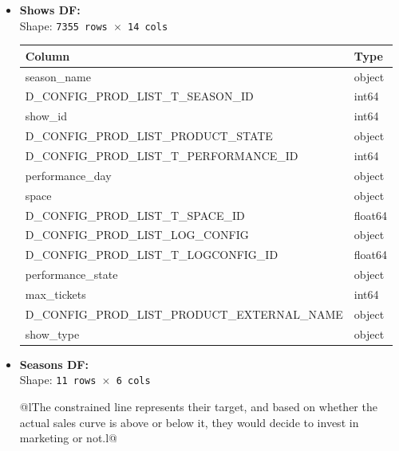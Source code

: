 \documentclass{Configuration_Files/PoliMi3i_thesis}
\begin{document}
\begin{itemize}
  \item \textbf{Shows DF:}\\[-0.5ex]
        Shape: \texttt{7355 rows $\times$ 14 cols}\\[1ex]
        \begin{tabular}{@{}ll@{}}
          \toprule
          \textbf{Column}                             & \textbf{Type}     \\
          \midrule
          season\_name                                & object            \\
          D\_CONFIG\_PROD\_LIST\_T\_SEASON\_ID        & int64             \\
          show\_id                                   & int64             \\
          D\_CONFIG\_PROD\_LIST\_PRODUCT\_STATE       & object            \\
          D\_CONFIG\_PROD\_LIST\_T\_PERFORMANCE\_ID   & int64             \\
          performance\_day                           & object            \\
          space                                       & object            \\
          D\_CONFIG\_PROD\_LIST\_T\_SPACE\_ID         & float64           \\
          D\_CONFIG\_PROD\_LIST\_LOG\_CONFIG          & object            \\
          D\_CONFIG\_PROD\_LIST\_T\_LOGCONFIG\_ID     & float64           \\
          performance\_state                         & object            \\
          max\_tickets                               & int64             \\
          D\_CONFIG\_PROD\_LIST\_PRODUCT\_EXTERNAL\_NAME & object          \\
          show\_type                                  & object            \\
          \bottomrule
        \end{tabular}
\clearpage
  \item \textbf{Seasons DF:}\\[-0.5ex]
        Shape: \texttt{11 rows $\times$ 6 cols}\\[1ex]
        \begin{tabular}{@{}lThe constrained line represents their target, and based on whether the actual sales curve is above or below it, they would decide to invest in marketing or not.l@{}}

\end{tabular}
\end{itemize}
\end{document}
